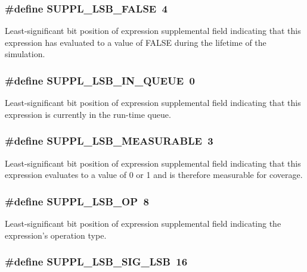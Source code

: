\subsubsection{\setlength{\rightskip}{0pt plus 5cm}\#define SUPPL\_\-LSB\_\-FALSE\ 4}\label{group__expr__suppl_a4}


Least-significant bit position of expression supplemental field indicating that this expression has evaluated to a value of FALSE during the lifetime of the simulation. 
\subsubsection{\setlength{\rightskip}{0pt plus 5cm}\#define SUPPL\_\-LSB\_\-IN\_\-QUEUE\ 0}\label{group__expr__suppl_a0}


Least-significant bit position of expression supplemental field indicating that this expression is currently in the run-time queue. 
\subsubsection{\setlength{\rightskip}{0pt plus 5cm}\#define SUPPL\_\-LSB\_\-MEASURABLE\ 3}\label{group__expr__suppl_a3}


Least-significant bit position of expression supplemental field indicating that this expression evaluates to a value of 0 or 1 and is therefore measurable for coverage. 
\subsubsection{\setlength{\rightskip}{0pt plus 5cm}\#define SUPPL\_\-LSB\_\-OP\ 8}\label{group__expr__suppl_a6}


Least-significant bit position of expression supplemental field indicating the expression's operation type. 
\subsubsection{\setlength{\rightskip}{0pt plus 5cm}\#define SUPPL\_\-LSB\_\-SIG\_\-LSB\ 16}\label{group__expr__suppl_a7}


